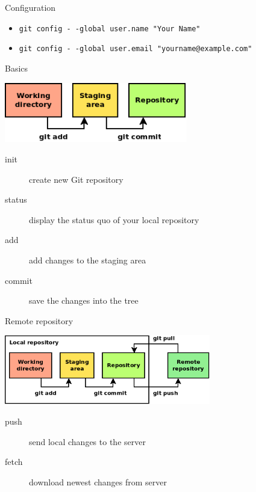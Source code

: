 \documentclass[14pt]{beamer}
\begin{document}
	\begin{frame}{Configuration}
		\begin{itemize}
		\item \texttt{git config -\,-global user.name "Your Name"}
		\item \texttt{git config -\,-global user.email "yourname@example.com"}
		\end{itemize}
	\end{frame}

	\begin{frame}{Basics}
        \begin{center}
	    \includegraphics[width=8cm]{commit.png}
        \end{center}
		\begin{description}
		\item[init] create new Git repository
		\item[status] display the status quo of your local repository
		\item[add] add changes to the staging area
		\item[commit] save the changes into the tree
		\end{description}
	\end{frame}

	\begin{frame}{Remote repository}
        \begin{center}
	    \includegraphics[width=9cm]{remote.png}
        \end{center}
		\begin{description}
		\item[push] send local changes to the server
		\item[fetch] download newest changes from server
		\end{description}
	\end{frame}
\end{document}

